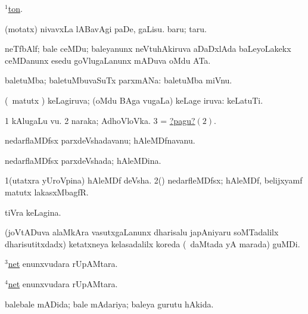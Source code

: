 \noindent
\gl{\pagu}
\bmng
{} \hyperref{kandict_t.pdf}{T}{ton(1) pagu(4)}{$^1$ton}. 
\emng
\eentry

\bentry
{}
\gl{\sakirx}
\bmng
(motatx) nivavxLa lABavAgi 
\banum
{} paDe, gaLisu. 
 baru; taru. 
\eanum
\emng
\eentry

\bentry
{}
\gl{\nA}
\bmng
neTfbAlf; bale ceMDu; baleyanunx neVtuhAkiruva aDaDxlAda baLeyoLakekx ceMDanunx esedu goVlugaLanunx mADuva oMdu ATa. 
\emng
\eentry

\bentry
{}
\gl{\nA}
\bmng
baletuMba; baletuMbuvaSuTx parxmANa:  baletuMba miVnu. 
\emng
\eentry

\bentry
{}
\gl{\gu}
\bmng
(\pArxparx\ matutx \hA) keLagiruva; (oMdu BAga \mo vugaLa) keLage iruva:  keLatuTi. 
\emng

\noindent
\gl{\pagu}
\bmng
\bnum
\num{1}  kAlugaLu \mo vu. 
\hypertarget{nether pagu2}{} 
\num{2}  naraka; AdhoVloVka. 
\num{3}  = \hyperlink{nether pagu2}{?pagu?\((2)\)}. 
\enum
\emng
\eentry

\bentry
{}
\gl{\nA}
\bmng
nedarflaMDfsx parxdeVshadavanu; hAleMDfnavanu. 
\emng
\eentry

\bentry
{}
\gl{\gu}
\bmng
nedarflaMDfsx parxdeVshada; hAleMDina. 
\emng
\eentry

\bentry
{}
\gl{\nA}
\bmng
\bnum
\num{1}(utatxra yUroVpina) hAleMDf deVsha. 
\num{2}(\ca) nedarfleMDfsx; hAleMDf, belijxyamf matutx lakasxMbagfR. 
\enum
\emng
\eentry

\bentry
{}
\gl{\gu}
\bmng
tiVra keLagina. 
\emng
\eentry

\bentry
{}
\gl{\nA}
\bmng
(joVtADuva alaMkAra vasutxgaLanunx dharisalu japAniyaru soMTadalilx dharisutitxdadx) ketatxneya kelasadalilx koreda (\kanmu\ daMtada yA marada) guMDi. 
\emng
\eentry

\bentry
{}
\gl{\gu}
\bmng
\hyperlink{net(3)}{$^3$net} enunxvudara rUpAMtara. 
\emng
\eentry

\bentry
{}
\gl{\sakirx}
\bmng
\hyperlink{net(4)}{$^4$net} enunxvudara rUpAMtara. 
\emng
\eentry

\bentry
{}
\gl{\gu}
\bmng
balebale mADida; bale mAdariya; baleya gurutu hAkida. 
\emng
\eentry

